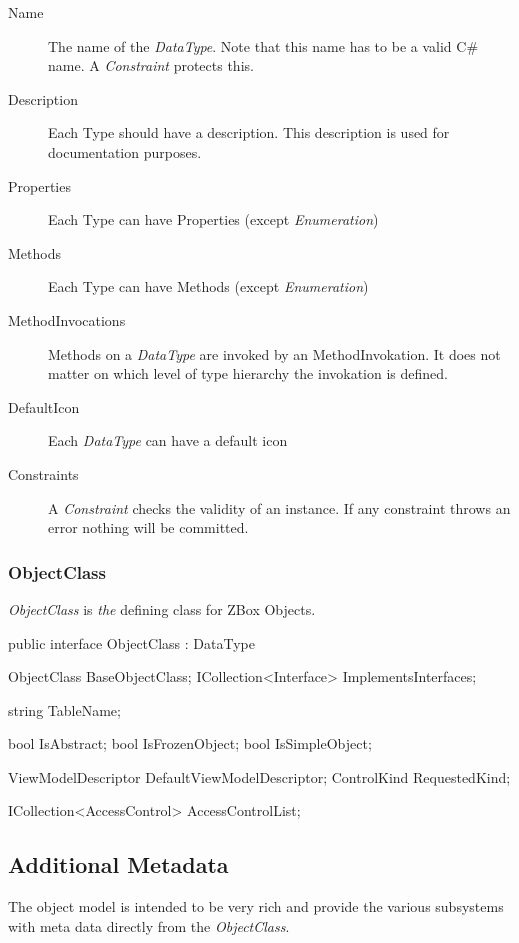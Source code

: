 \begin{description}
\item[Name] { The name of the \emph{DataType}. Note that this name has to be a
valid C\# name. A \emph{Constraint} protects this. }
\item[Description] { Each Type should have a description. This description is
used for documentation purposes. }
\item[Properties] { Each Type can have Properties (except \emph{Enumeration})}
\item[Methods] { Each Type can have Methods (except \emph{Enumeration})}
\item[MethodInvocations] { Methods on a \emph{DataType} are invoked by an
MethodInvokation. It does not matter on which level of type hierarchy the
invokation is defined. }
\item[DefaultIcon] { Each \emph{DataType} can have a default icon}
\item[Constraints] { A \emph{Constraint} checks the validity of an instance. If
any constraint throws an error nothing will be committed. }
\end{description}

\subsubsection{ObjectClass}
\emph{ObjectClass} is \emph{the} defining class for ZBox Objects.

\begin{CS}
public interface ObjectClass : DataType 
{
    ObjectClass BaseObjectClass;
    ICollection<Interface> ImplementsInterfaces;

    string TableName;

    bool IsAbstract;
    bool IsFrozenObject;
    bool IsSimpleObject;

    ViewModelDescriptor DefaultViewModelDescriptor;
    ControlKind RequestedKind;

    ICollection<AccessControl> AccessControlList;
}
\end{CS}



\subsection{Additional Metadata}

The object model is intended to be very rich and provide the various
subsystems with meta data directly from the \emph{ObjectClass}.

